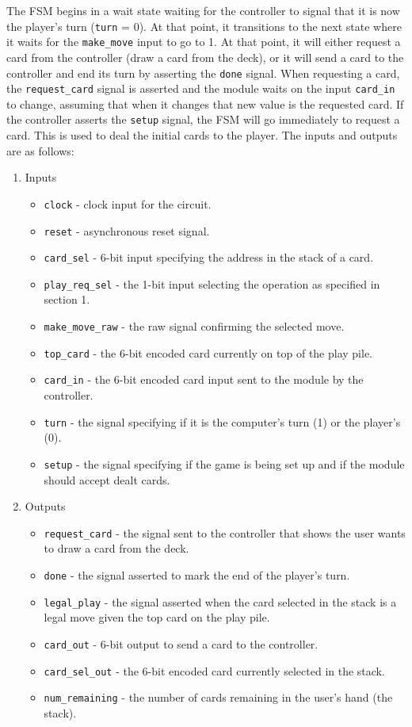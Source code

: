 \documentclass[12pt]{article}
\begin{document}
The FSM begins in a wait state waiting for the controller to signal that it is now the player's turn (\texttt{turn} = 0). At that point, it transitions to the next state where it waits for the \texttt{make\_move} input to go to 1. At that point, it will either request a card from the controller (draw a card from the deck), or it will send a card to the controller and end its turn by asserting the \texttt{done} signal. When requesting a card, the \texttt{request\_card} signal is asserted and the module waits on the input \texttt{card\_in} to change, assuming that when it changes that new value is the requested card. If the controller asserts the \texttt{setup} signal, the FSM will go immediately to request a card. This is used to deal the initial cards to the player. The inputs and outputs are as follows:\\

\begin{enumerate}
\item Inputs
\begin{itemize}
\item \texttt{clock} - clock input for the circuit.
\item \texttt{reset} - asynchronous reset signal.
\item \texttt{card\_sel} - 6-bit input specifying the address in the stack of a card.
\item \texttt{play\_req\_sel} - the 1-bit input selecting the operation as specified in section 1.
\item \texttt{make\_move\_raw} - the raw signal confirming the selected move.
\item \texttt{top\_card} - the 6-bit encoded card currently on top of the play pile.
\item \texttt{card\_in} - the 6-bit encoded card input sent to the module by the controller.
\item \texttt{turn} - the signal specifying if it is the computer's turn (1) or the player's (0).
\item \texttt{setup} - the signal specifying if the game is being set up and if the module should accept dealt cards.
\end{itemize}
\item Outputs
\begin{itemize}
\item \texttt{request\_card} - the signal sent to the controller that shows the user wants to draw a card from the deck.
\item \texttt{done} - the signal asserted to mark the end of the player's turn.
\item \texttt{legal\_play} - the signal asserted when the card selected in the stack is a legal move given the top card on the play pile.
\item \texttt{card\_out} - 6-bit output to send a card to the controller.
\item \texttt{card\_sel\_out} - the 6-bit encoded card currently selected in the stack.
\item \texttt{num\_remaining} - the number of cards remaining in the user's hand (the stack).
\end{itemize}
\end{enumerate}  
\end{document}
